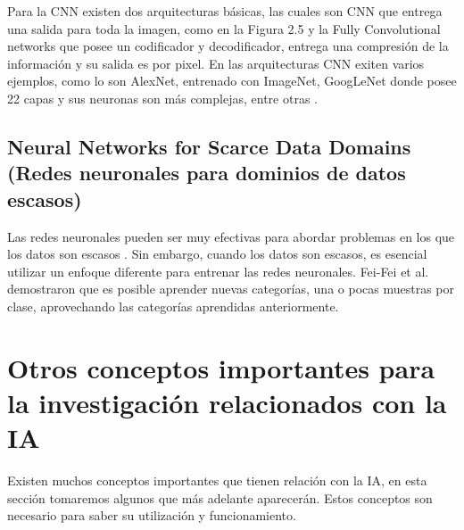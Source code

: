 \par Para la CNN existen dos arquitecturas básicas, las cuales son CNN que entrega una salida para toda la imagen, como en la Figura 2.5 y la Fully Convolutional networks que posee un codificador y decodificador, entrega una compresión de la información y su salida es por pixel. En las arquitecturas CNN exiten varios ejemplos, como lo son AlexNet, entrenado con ImageNet, GoogLeNet donde posee 22 capas y sus neuronas son más complejas, entre otras \cite{NIPS2012_c399862d}.\\


\doublespacing
\subsection{Neural Networks for Scarce Data Domains  (Redes neuronales para dominios de datos escasos)}
Las redes neuronales pueden ser muy efectivas para abordar problemas en los que los datos son escasos \cite{Carola}. Sin embargo, cuando los datos son escasos, es esencial utilizar un enfoque diferente para entrenar las redes neuronales. Fei-Fei et al. \cite{Fei-Fei2006} demostraron que es posible aprender nuevas categorías, una o pocas muestras por clase, aprovechando las categorías aprendidas anteriormente. \\

\doublespacing
\section{Otros conceptos importantes para la investigación relacionados con la IA}
Existen muchos conceptos importantes que tienen relación con la IA, en esta sección tomaremos algunos que más adelante aparecerán. Estos conceptos son necesario para saber su utilización y funcionamiento.

\doublespacing
